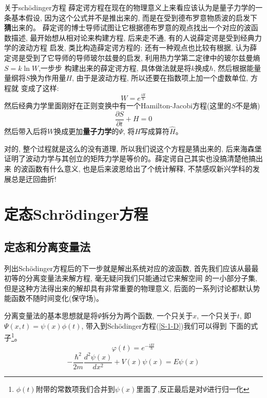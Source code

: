 \documentclass[a4paper,zihao=-4,linespread=1]{ctexrep}
\newenvironment{lequation}{\large\begin{equation}}{\end{equation}}
\begin{document}
    \begin{history}{关于sch\"{o}dinger方程}
        薛定谔方程在现在的物理意义上来看应该认为是量子力学的一条基本假设, 因为这个公式并不是推出来的, 而是在受到德布罗意物质波的启发下\textbf{猜}出来的。
        薛定谔的博士导师试图让它根据德布罗意的观点找出一个对应的波函数描述, 最开始想从相对论来构建方程, 后来走不通, 有的人说薛定谔是受到经典力学的波动方程
        启发, 类比构造薛定谔方程的; 还有一种观点也比较有根据, 认为薛定谔是受到了它导师的导师玻尔兹曼的启发, 利用热力学第二定律中的玻尔兹曼熵$S=k\ln W$,一步步
        构建出来的薛定谔方程, 具体做法就是将$k$换成$\hbar$, 然后根据能量量纲将$S$换为作用量$H$, 由于是波动方程, 所以还要在指数项上加一个虚数单位, 方程就
        变成了这样:$$W=e^{\frac{iH}{\hbar}}$$然后经典力学里面刚好在正则变换中有一个Hamilton-Jacobi方程(这里的$S$不是熵)$$\frac{\partial S}{\partial t}+H=0$$
        然后带入后将$W$换成更加\textbf{量子力学}的$\Psi$, 将$H$写成算符$\hat{H}$。

        对的, 整个过程就是这么的没有道理, 所以我们说这个方程是猜出来的, 后来海森堡证明了波动力学与其创立的矩阵力学是等价的。薛定谔自己其实也没搞清楚他搞出来
        的波函数有什么意义, 也是后来波恩给出了个统计解释, 不禁感叹新兴学科的发展总是迂回曲折!
    \end{history}
    \newpage
    \chapter{定态Schr\"{o}dinger方程}
    \section{定态和分离变量法}
    列出Sch\"{o}dinger方程后的下一步就是解出系统对应的波函数, 首先我们应该从最最初等的分离变量法来解方程, 毫无疑问我们只能通过它来解空间
    的一小部分子集, 但是这种方法得出来的解却具有非常重要的物理意义, 后面的一系列讨论都默认势能函数不随时间变化(保守场)。

    分离变量法的基本思想就是将$\Psi$拆分为两个函数, 一个只关于$x$, 一个只关于$t$, 即$\Psi(x,t)=\psi(x)\phi(t)$, 带入到Sch\"{o}dinger方程(\ref{S-1-D})我们可以得到
    下面的式子\footnote{$\phi(t)$附带的常数项我们合并到$\psi(x)$里面了,反正最后是对$\Psi$进行归一化}。
    \begin{lequation}
        \label{wiggle-function}
        \boxed{
            \varphi(t)=e^{-\frac{iEt}{\hbar}}
        }
    \end{lequation}
    \begin{lequation}
        \label{time-independent-equation}
        \boxed{
            -\frac{\hbar^2}{2m}\frac{d^2\psi(x)}{dx^2}+V(x)\psi(x)=E\psi(x)
        }
    \end{lequation}
\end{document}
